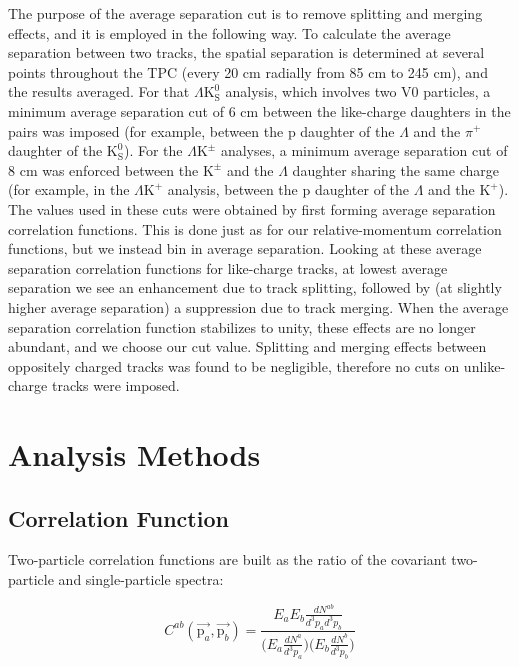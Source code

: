 \documentclass[ALICE,manyauthors]{cernphprep}
\newcommand{\Lam}{$\Lambda$\xspace}
\newcommand{\KchP}{$\mathrm{K^{+}}$\xspace}
\newcommand{\Kpm}{$\mathrm{K^{\pm}}$\xspace}
\newcommand{\Ks}{$\mathrm{K^{0}_{S}}$\xspace}
\newcommand{\LamKchP}{$\Lambda\mathrm{K^{+}}$\xspace}
\newcommand{\LamKpm}{$\Lambda\mathrm{K^{\pm}}$\xspace}
\newcommand{\LamKs}{$\Lambda\mathrm{K^{0}_{S}}$\xspace}
\begin{document}
The purpose of the average separation cut is to remove splitting and merging effects, and it is employed in the following way.  
To calculate the average separation between two tracks, the spatial separation is determined at several points throughout the TPC (every 20 cm radially from 85 cm to 245 cm), and the results averaged.
For that \LamKs analysis, which involves two V0 particles, a minimum average separation cut of 6 cm between the like-charge daughters in the pairs was imposed (for example, between the p daughter of the \Lam and the $\pi^{+}$ daughter of the \Ks).
For the \LamKpm analyses, a minimum average separation cut of 8 cm was enforced between the \Kpm and the \Lam daughter sharing the same charge (for example, in the \LamKchP analysis, between the p daughter of the \Lam and the \KchP).
The values used in these cuts were obtained by first forming average separation correlation functions.
This is done just as for our relative-momentum correlation functions, but we instead bin in average separation.
Looking at these average separation correlation functions for like-charge tracks, at lowest average separation we see an enhancement due to track splitting, followed by (at slightly higher average separation) a suppression due to track merging.
When the average separation correlation function stabilizes to unity, these effects are no longer abundant, and we choose our cut value.
Splitting and merging effects between oppositely charged tracks was found to be negligible, therefore no cuts on unlike-charge tracks were imposed.



\section{Analysis Methods}
\label{sec:AnalysisMethods}

\subsection{Correlation Function}
\label{sec:CorrelationFunction}
Two-particle correlation functions are built as the ratio of the covariant two-particle and single-particle spectra:

\begin{equation}
  C^{ab}(\vec{\mathrm{p}_{a}},\vec{\mathrm{p}_{b}}) = \frac{E_{a}E_{b}\frac{dN^{ab}}{d^{3}p_{a}d^{3}p_{b}}}{\big( E_{a}\frac{dN^{a}}{d^{3}p_{a}} \big) \big( E_{b}\frac{dN^{b}}{d^{3}p_{b}} \big)}
\label{eqn:CfRatioSpectra}
\end{equation}
\end{document}
